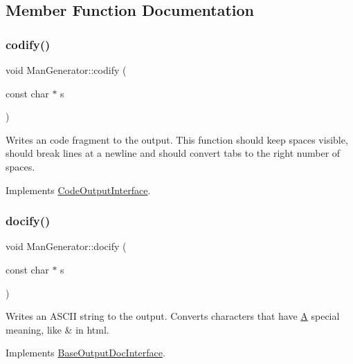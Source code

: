 \subsection{Member Function Documentation}
\mbox{\label{class_man_generator_a6e70bf6444a4e6d5db43f5bbb7b6b125}} 
\subsubsection{\texorpdfstring{codify()}{codify()}}
{\footnotesize\ttfamily void Man\+Generator\+::codify (\begin{DoxyParamCaption}\item[{const char $\ast$}]{s }\end{DoxyParamCaption})\hspace{0.3cm}{\ttfamily [virtual]}}

Writes an code fragment to the output. This function should keep spaces visible, should break lines at a newline and should convert tabs to the right number of spaces. 

Implements \mbox{\hyperlink{class_code_output_interface_aa29a5eedda08596ace50ed5b59c8ae7f}{Code\+Output\+Interface}}.

\mbox{\label{class_man_generator_aae62a687e228c0f3c5b698570c603022}} 
\subsubsection{\texorpdfstring{docify()}{docify()}}
{\footnotesize\ttfamily void Man\+Generator\+::docify (\begin{DoxyParamCaption}\item[{const char $\ast$}]{s }\end{DoxyParamCaption})\hspace{0.3cm}{\ttfamily [virtual]}}

Writes an A\+S\+C\+II string to the output. Converts characters that have \mbox{\hyperlink{class_a}{A}} special meaning, like {\ttfamily \&} in html. 

Implements \mbox{\hyperlink{class_base_output_doc_interface_ad7d3f6631bd157739170690e669b3e75}{Base\+Output\+Doc\+Interface}}.

\mbox{\label{class_man_generator_acc9e3c928bd473ce079e323f19948dc7}} 
